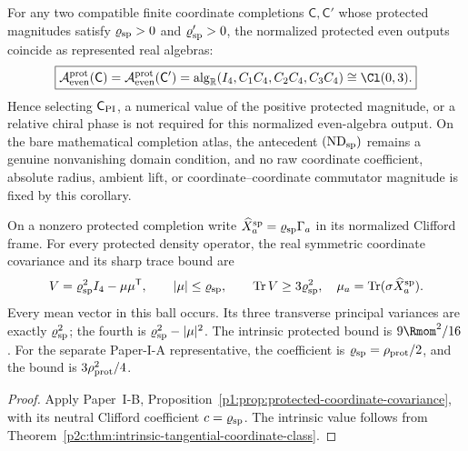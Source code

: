 \documentclass[12pt,a4paper]{article}
\begin{document}
\begin{corollary}
\label{p2c:cor:protected-clifford-selector-discharge}
For any two compatible finite coordinate completions \(\mathsf C,\mathsf C'\)
whose protected magnitudes satisfy
\(\varrho_{\rm sp}>0\) and \(\varrho'_{\rm sp}>0\), the normalized protected
even outputs coincide as represented real algebras:
\[
 \boxed{
 \mathcal A_{\rm even}^{\rm prot}(\mathsf C)
 =\mathcal A_{\rm even}^{\rm prot}(\mathsf C')
 =\operatorname{alg}_{\mathbb R}(I_4,C_1C_4,C_2C_4,C_3C_4)
 \cong\Cl(0,3).}
\]
Hence selecting \(\mathsf C_{\rm PI}\), a numerical value of the positive
protected magnitude, or a relative chiral phase is not required for this
normalized even-algebra output.  On the bare mathematical completion atlas,
the antecedent \((\mathrm{ND}_{\rm sp})\) remains a genuine nonvanishing domain
condition, and no raw coordinate coefficient, absolute radius, ambient lift,
or coordinate--coordinate commutator magnitude is fixed by this corollary.
\end{corollary}

\begin{corollary}
\label{p2c:cor:protected-coordinate-covariance}
On a nonzero protected completion write
$\widehat X_a^{\rm sp}=\varrho_{\rm sp}\Gamma_a$ in its normalized
Clifford frame.  For every protected density operator, the real symmetric
coordinate covariance and its sharp trace bound are
\[
 V=\varrho_{\rm sp}^2I_4-\mu\mu^{\mathsf T},\qquad
 |\mu|\le\varrho_{\rm sp},\qquad
 \operatorname{Tr}V\ge3\varrho_{\rm sp}^2,
 \quad \mu_a=\operatorname{Tr}(\sigma\widehat X_a^{\rm sp}).
\]
Every mean vector in this ball occurs.  Its three transverse principal
variances are exactly $\varrho_{\rm sp}^2$; the fourth is
$\varrho_{\rm sp}^2-|\mu|^2$.
The intrinsic protected bound is $9\Rmom^2/16$.
For the separate Paper-I-A representative, the coefficient is
$\varrho_{\rm sp}=\rho_{\rm prot}/2$, and the bound is
$3\rho_{\rm prot}^2/4$.
\end{corollary}
\begin{proof}
Apply Paper~I-B, Proposition~\ref{p1:prop:protected-coordinate-covariance},
with its neutral Clifford coefficient $c=\varrho_{\rm sp}$.
The intrinsic value follows from
Theorem~\ref{p2c:thm:intrinsic-tangential-coordinate-class}.
\end{proof}
\end{document}
